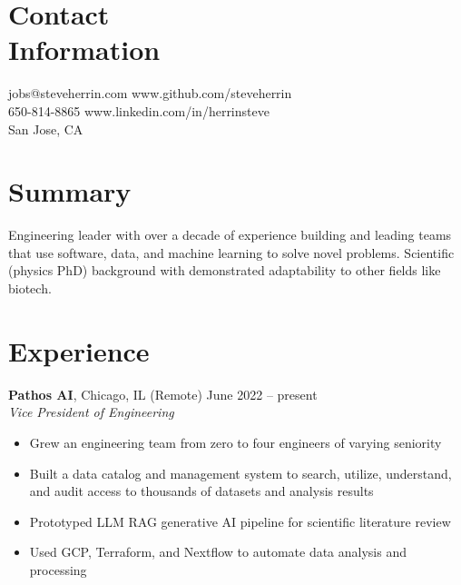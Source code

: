 \documentclass[margin,line]{resume}
\begin{document}
\begin{resume}

    \section{\mysidestyle Contact\\Information}

    jobs@steveherrin.com		\hfill www.github.com/steveherrin		\vspace{0mm}\\\vspace{0mm}%
    650-814-8865				\hfill www.linkedin.com/in/herrinsteve		\vspace{0mm}\\\vspace{-4.5mm}%
    San Jose, CA    				\hfill		\vspace{0mm}\\\vspace{0mm}%

    \section{\mysidestyle Summary}
    Engineering leader with over a decade of experience building and leading teams that use software, data, and machine learning to solve novel problems. Scientific (physics PhD) background with demonstrated adaptability to other fields like biotech.%
    \section{\mysidestyle Experience}
    \textbf{Pathos AI}, Chicago, IL (Remote) \hfill\vspace{1mm}\hfill June 2022 -- present\\%
    \textsl{Vice President of Engineering}
    \begin{itemize}
    \item Grew an engineering team from zero to four engineers of varying seniority
    \item Built a data catalog and management system to search, utilize, understand, and audit access to thousands of datasets and analysis results
    \item Prototyped LLM RAG generative AI pipeline for scientific literature review
    \item Used GCP, Terraform, and Nextflow to automate data analysis and processing
    \end{itemize}


\end{resume}
\end{document}
